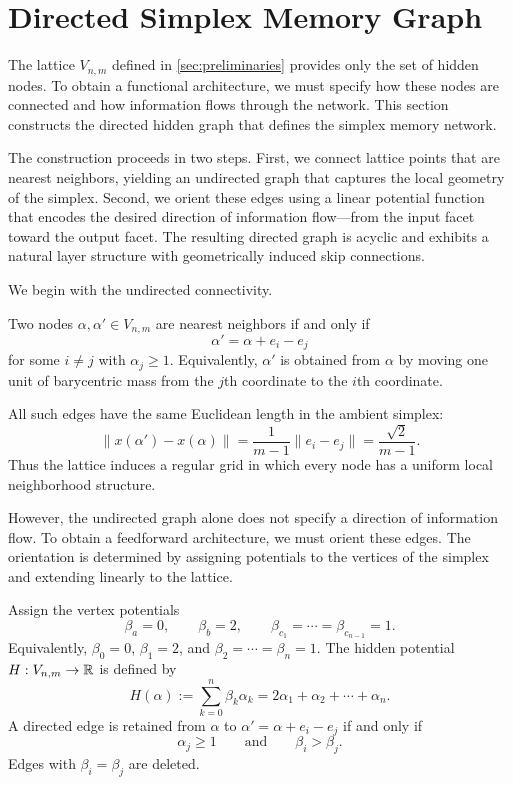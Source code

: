 \section{Directed Simplex Memory Graph}
\label{sec:directed_graph}

The lattice $V_{n,m}$ defined in \cref{sec:preliminaries} provides only the set of hidden nodes. To obtain a functional architecture, we must specify how these nodes are connected and how information flows through the network. This section constructs the directed hidden graph that defines the simplex memory network.

The construction proceeds in two steps. First, we connect lattice points that are nearest neighbors, yielding an undirected graph that captures the local geometry of the simplex. Second, we orient these edges using a linear potential function that encodes the desired direction of information flow---from the input facet toward the output facet. The resulting directed graph is acyclic and exhibits a natural layer structure with geometrically induced skip connections.

We begin with the undirected connectivity.

\begin{definition}
Two nodes $\alpha,\alpha'\in V_{n,m}$ are nearest neighbors if and only if
\[
\alpha' = \alpha + e_i - e_j
\]
for some $i\neq j$ with $\alpha_j\geq 1$. Equivalently, $\alpha'$ is obtained from $\alpha$ by moving one unit of barycentric mass from the $j$th coordinate to the $i$th coordinate.
\end{definition}

All such edges have the same Euclidean length in the ambient simplex:
\[
\|x(\alpha')-x(\alpha)\| = \frac{1}{m-1}\|e_i-e_j\| = \frac{\sqrt{2}}{m-1}.
\]
Thus the lattice induces a regular grid in which every node has a uniform local neighborhood structure.

However, the undirected graph alone does not specify a direction of information flow. To obtain a feedforward architecture, we must orient these edges. The orientation is determined by assigning potentials to the vertices of the simplex and extending linearly to the lattice.

\begin{definition}
Assign the vertex potentials
\[
\beta_a=0,
\qquad
\beta_b=2,
\qquad
\beta_{c_1}=\cdots=\beta_{c_{n-1}}=1.
\]
Equivalently, $\beta_0=0$, $\beta_1=2$, and $\beta_2=\cdots=\beta_n=1$. The hidden potential $H: V_{n,m} \to \mathbb{R}$ is defined by
\[
H(\alpha) := \sum_{k=0}^n \beta_k\alpha_k = 2\alpha_1 + \alpha_2 + \cdots + \alpha_n.
\]
A directed edge is retained from $\alpha$ to $\alpha' = \alpha + e_i - e_j$ if and only if
\[
\alpha_j\geq 1
\qquad\text{and}\qquad
\beta_i > \beta_j.
\]
Edges with $\beta_i=\beta_j$ are deleted.
\end{definition}


